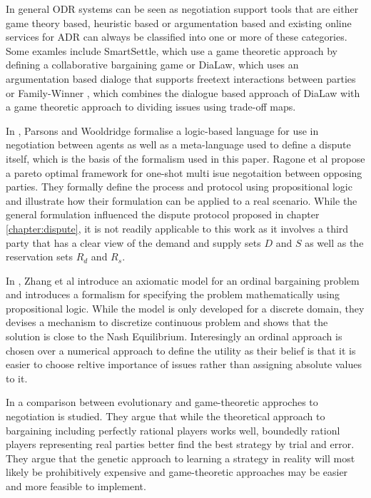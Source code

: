 \documentclass[12pt,msc,a4paper,oneside]{ucl_thesis}
\begin{document}
In general ODR systems can be seen as negotiation support tools that are either game theory based, heuristic based or argumentation based \cite{Rahwan:2003:AN:1030328.1030332} and existing online services for ADR can always be classified into one or more of these categories. Some examles include SmartSettle, which use a game theoretic approach by defining a collaborative bargaining game \cite{thiessen2003mobile} or DiaLaw, which uses an argumentation based dialoge that supports freetext interactions between parties or Family-Winner \cite{Bellucci:2004:IAI:1032651.1033678}, which combines the dialogue based approach of DiaLaw with a game theoretic approach to dividing issues using trade-off maps.

In \cite{Wooldridge:2000:LN:3006433.3006516}, Parsons and Wooldridge formalise a logic-based language for use in negotiation between agents as well as a meta-language used to define a dispute itself, which is the basis of the formalism used in this paper. Ragone et al \cite{Ragone:2006:PAO:1124566.1124569} propose a pareto optimal framework for one-shot multi isue negotaition between opposing parties. They formally define the process and protocol using propositional logic and illustrate how their formulation can be applied to a real scenario. While the general formulation influenced the dispute protocol proposed in chapter \ref{chapter:dispute}, it is not readily applicable to this work as it involves a third party that has a clear view of the demand and supply sets $D$ and $S$ as well as the reservation sets $R_d$ and $R_s$.

In \cite{DBLP:journals:corr:ZhangZ14a}, Zhang et al introduce an axiomatic model for an ordinal bargaining problem and introduces a formalism for specifying the problem mathematically using propositional logic. While the model is only developed for a discrete domain, they devises a mechanism to discretize continuous problem and shows that the solution is close to the Nash Equilibrium. Interesingly an ordinal approach is chosen over a numerical approach to define the utility as their belief is that it is easier to choose reltive importance of issues rather than assigning absolute values to it.

In \cite{fatima2005comparative} a comparison between evolutionary and game-theoretic approches to negotiation is studied. They argue that while the theoretical approach to bargaining including perfectly rational players works well, boundedly rationl players representing real parties better find the best strategy by trial and error. They argue that the genetic approach to learning a strategy in reality will most likely be prohibitively expensive and game-theoretic approaches may be easier and more feasible to implement.
\end{document}
